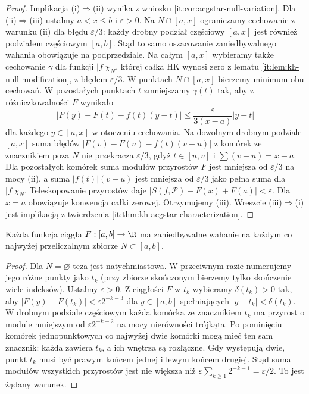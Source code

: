 \begin{proof}
Implikacja (i)$\Rightarrow$(ii) wynika z wniosku
\ref{it:cor:acgstar-null-variation}.
Dla (ii)$\Rightarrow$(iii) ustalmy $a<x\le b$ i
$\varepsilon>0$. Na $N\cap[a,x]$ ograniczamy cechowanie z warunku (ii)
dla błędu $\varepsilon/3$: każdy drobny podział częściowy
$[a,x]$ jest również podziałem częściowym $[a,b]$.
Stąd to samo oszacowanie zaniedbywalnego wahania
obowiązuje na podprzedziale.
Na całym $[a,x]$ wybieramy także cechowanie $\gamma$
dla funkcji $|f|\chi_N$, której całka HK wynosi zero
z lematu \ref{it:lem:kh-null-modification}, z błędem
$\varepsilon/3$. W punktach $N\cap[a,x]$ bierzemy
minimum obu cechowań. W pozostałych punktach $t$
zmniejszamy $\gamma(t)$ tak, aby z różniczkowalności
$F$ wynikało
\[
 |F(y)-F(t)-f(t)(y-t)|
 \le \frac{\varepsilon}{3(x-a)}|y-t|
\]
dla każdego $y\in[a,x]$ w otoczeniu cechowania.
Na dowolnym drobnym podziale $[a,x]$ suma błędów
$|F(v)-F(u)-f(t)(v-u)|$ z komórek ze znacznikiem
poza $N$ nie przekracza $\varepsilon/3$, gdyż
$t\in[u,v]$ i $\sum(v-u)=x-a$.
Dla pozostałych komórek suma modułów przyrostów
$F$ jest mniejsza od $\varepsilon/3$ na mocy (ii),
a suma $|f(t)|(v-u)$ jest mniejsza od $\varepsilon/3$
jako pełna suma dla $|f|\chi_N$.
Teleskopowanie przyrostów daje
$|S(f,\mathcal P)-F(x)+F(a)|<\varepsilon$.
Dla $x=a$ obowiązuje konwencja całki zerowej.
Otrzymujemy (iii). Wreszcie (iii)$\Rightarrow$(i)
jest implikacją z twierdzenia
\ref{it:thm:kh-acgstar-characterization}.
\end{proof}

\begin{wniosek}
\label{it:cor:denjoy-countable-variation}
Każda funkcja ciągła $F:[a,b]\to\R$ ma zaniedbywalne
wahanie na każdym co najwyżej przeliczalnym zbiorze
$N\subset[a,b]$.
\end{wniosek}
\begin{proof}
Dla $N=\varnothing$ teza jest natychmiastowa. W przeciwnym
razie numerujemy jego różne punkty jako $t_k$ (przy zbiorze
skończonym bierzemy tylko skończenie wiele indeksów).
Ustalmy $\varepsilon>0$. Z ciągłości $F$ w $t_k$ wybieramy
$\delta(t_k)>0$ tak, aby $|F(y)-F(t_k)|<
\varepsilon 2^{-k-3}$ dla $y\in[a,b]$ spełniających
$|y-t_k|<\delta(t_k)$.
W drobnym podziale częściowym każda komórka ze znacznikiem
$t_k$ ma przyrost o module mniejszym od
$\varepsilon 2^{-k-2}$ na mocy nierówności trójkąta.
Po pominięciu komórek jednopunktowych co najwyżej dwie
komórki mogą mieć ten sam znacznik: każda zawiera $t_k$,
a ich wnętrza są rozłączne. Gdy występują dwie, punkt
$t_k$ musi być prawym końcem jednej i lewym końcem drugiej.
Stąd suma modułów wszystkich przyrostów jest nie większa
niż $\varepsilon\sum_{k\ge1}2^{-k-1}=\varepsilon/2$.
To jest żądany warunek.
\end{proof}

